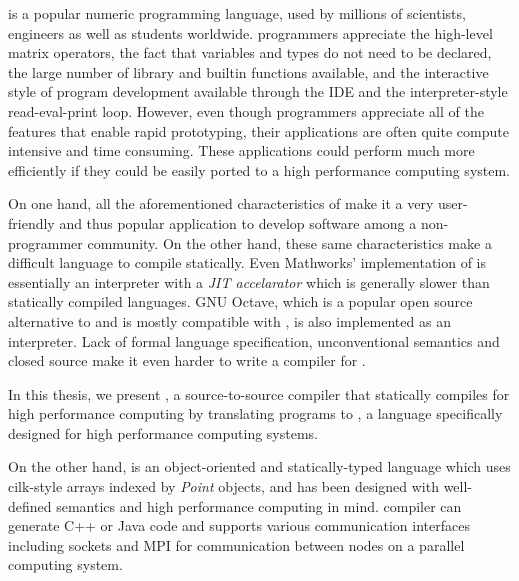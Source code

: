 \matlab is a popular numeric programming language, used by millions of
scientists, engineers as well as students worldwide\cite{MatlabGrowth}.  \matlab
programmers appreciate the high-level matrix operators,  the fact that
variables and types do not need to be declared, the large number of library and
builtin functions available, and the interactive style of program development
available through the IDE and the interpreter-style read-eval-print loop.
However, even though \matlab programmers appreciate all of the features that
enable rapid prototyping,  their applications are often quite compute intensive
and time consuming. These applications could perform much more efficiently if
they could be easily ported to a high performance computing system.  

On one hand, all the aforementioned characteristics of \matlab make it a very 
user-friendly and thus popular application to develop software among a
non-programmer community. On the other hand, these same characteristics make
\matlab a difficult language to compile statically. Even Mathworks' 
implementation of \matlab is essentially an interpreter with a 
\emph{JIT accelarator}\cite{} which is generally slower than statically
compiled languages. GNU Octave, which is a popular open source alternative to  
\matlab and is mostly compatible with \matlab, is also implemented as an
interpreter\cite{}. Lack of formal language specification, unconventional semantics 
and closed source make it even harder to write a compiler for \matlab.

In this thesis, we present \mixten, a source-to-source compiler that statically 
compiles \matlab for high performance computing by translating \matlab programs
to \xten, a language specifically designed for high performance computing
systems. 

On the other hand, \xten is an object-oriented and statically-typed language
which uses cilk-style arrays indexed by \emph{Point} objects, and has been
designed with well-defined semantics and high performance computing in mind.
\xten compiler can generate C++ or Java code and supports various communication
interfaces including sockets and MPI for communication between nodes on a
parallel computing system.

